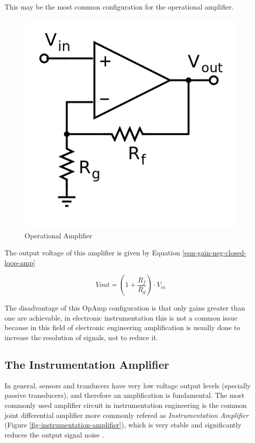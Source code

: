 		This may be the most common configuration for the operational amplifier.
		
	\begin{figure}[htbp]
		\centering
			\includegraphics[scale=0.6]{figuras/fig-closed-loop-opamp.png}
		\caption{Operational Amplifier \cite{fig-closed-loop-opamp}}
		\label{fig-closed-loop-opamp}
	\end{figure}

		The output voltage of this amplifier is given by Equation \ref{eqn-gain-neg-closed-loop-amp}

	\begin{equation}
		Vout =  \left( 1 + \frac{R_{f}}{R_{g}} \right) \cdot V_{in}
	\end{equation}\label{eqn-gain-neg-closed-loop-amp}

		The disadvantage of this OpAmp configuration is that only gains greater than one are achievable, in electronic instrumentation this is not a common issue because in this field of electronic engineering amplification is usually done to increase the resolution of signals, not to reduce it.

	\subsection{The Instrumentation Amplifier}

	In general, sensors and tranducers have very low voltage output levels (specially passive transducers), and therefore an amplification is fundamental. The most commonly used amplifier circuit in instrumentation engineering is the common joint differential amplifier more commonly refered as \textit{Instrumentation Amplifier} (Figure \ref{fig-instrumentation-amplifier}), which is very stable and significantly reduces the output signal noise \cite{wait1975introduction}.

